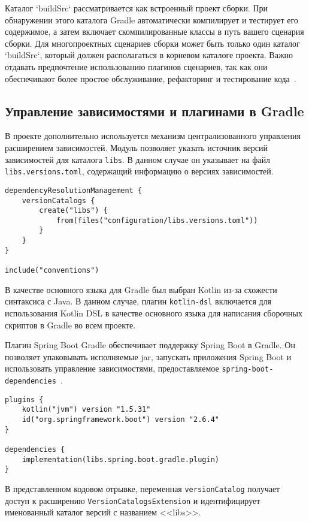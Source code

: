 Каталог `buildSrc` рассматривается как встроенный проект сборки.
При обнаружении этого каталога
Gradle автоматически компилирует и тестирует его содержимое, а затем включает скомпилированные
классы в путь вашего сценария сборки.
Для многопроектных сценариев сборки может быть только один
каталог `buildSrc`, который должен располагаться в корневом каталоге проекта.
Важно отдавать
предпочтение использованию плагинов сценариев, так как они обеспечивают более простое обслуживание,
рефакторинг и тестирование
кода~\cite{sharing_logic}.

\subsection{Управление зависимостями и плагинами в Gradle}

В проекте дополнительно используется механизм централизованного управления расширением зависимостей.
Модуль позволяет указать источник версий зависимостей для каталога \texttt{libs}.
В данном случае он указывает на файл \texttt{libs.versions.toml}, содержащий информацию о версиях зависимостей.

\begin{lstlisting}
dependencyResolutionManagement {
    versionCatalogs {
        create("libs") {
            from(files("configuration/libs.versions.toml"))
        }
    }
}

include("conventions")
\end{lstlisting}

В качестве основного языка для Gradle был выбран Kotlin из-за схожести синтаксиса с Java.
В данном случае, плагин \texttt{kotlin-dsl} включается для использования Kotlin DSL в качестве основного языка для написания сборочных скриптов в Gradle во всем проекте.

Плагин Spring Boot Gradle обеспечивает поддержку Spring Boot в Gradle.
Он позволяет упаковывать исполняемые jar, запускать приложения Spring Boot и использовать управление зависимостями, предоставляемое \texttt{spring-boot-dependencies}~\cite{spring_boot_gradle}.

\begin{lstlisting}
plugins {
    kotlin("jvm") version "1.5.31"
    id("org.springframework.boot") version "2.6.4"
}

dependencies {
    implementation(libs.spring.boot.gradle.plugin)
}
\end{lstlisting}

В представленном кодовом отрывке, переменная \texttt{versionCatalog} получает доступ к расширению \texttt{VersionCatalogsExtension} и идентифицирует именованный каталог версий с названием <<libs>>.

